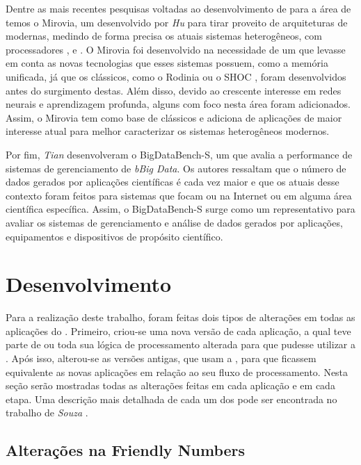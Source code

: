 Dentre as mais recentes pesquisas voltadas ao desenvolvimento de \benchs para a área de \HPC temos o Mirovia, um \bench desenvolvido por \textit{Hu} \etal \cite{miroviabenchmark} para tirar proveito de arquiteturas de \GPUs modernas, medindo de forma precisa os atuais sistemas heterogêneos, com processadores \multicore, \manycore e \GPUs. O Mirovia foi desenvolvido na necessidade de um \bench que levasse em conta as novas tecnologias que esses sistemas possuem, como a memória unificada, já que os \benchs clássicos, como o Rodinia \cite{rodiniabench} ou o SHOC \cite{shocbench}, foram desenvolvidos antes do surgimento destas. Além disso, devido ao crescente interesse em redes neurais e aprendizagem profunda, alguns  com foco nesta área foram adicionados. Assim, o Mirovia tem como base  de \benchs clássicos e adiciona  de aplicações de maior interesse atual para melhor caracterizar os sistemas heterogêneos modernos.

Por fim, \textit{Tian} \etal \cite{tianbench} desenvolveram o BigDataBench-S, um \bench que avalia a performance de sistemas de gerenciamento de \textit{bBig Data}. Os autores ressaltam que o número de dados gerados por aplicações científicas é cada vez maior e que os atuais \benchs desse contexto foram feitos para sistemas que focam ou na Internet ou em alguma área científica específica. Assim, o BigDataBench-S surge como um \bench representativo para avaliar os sistemas de gerenciamento e análise de dados gerados por aplicações, equipamentos e dispositivos de propósito científico.

\chapter{Desenvolvimento}
\label{ch:desenvolvimento}

Para a realização deste trabalho, foram feitas dois tipos de alterações em todas as aplicações do \capb. Primeiro, criou-se uma nova versão de cada aplicação, a qual teve parte de ou toda sua lógica de processamento alterada para que pudesse utilizar a \API \ASYNC. Após isso, alterou-se as versões antigas, que usam a \API \IPC, para que ficassem equivalente as novas aplicações em relação ao seu fluxo de processamento. Nesta seção serão mostradas todas as alterações feitas em cada aplicação e em cada etapa. Uma descrição mais detalhada de cada um dos  pode ser encontrada no trabalho de \textit{Souza} \etal \cite{Castro-Souza-CCPE:2016}.

\section{Alterações na Friendly Numbers}
\label{sec:objetivos}

